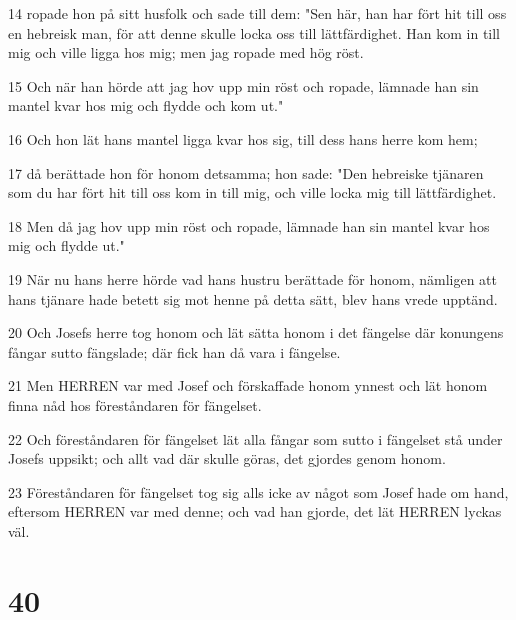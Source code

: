 \par 14 ropade hon på sitt husfolk och sade till dem: "Sen här, han har fört hit till oss en hebreisk man, för att denne skulle locka oss till lättfärdighet. Han kom in till mig och ville ligga hos mig; men jag ropade med hög röst.
\par 15 Och när han hörde att jag hov upp min röst och ropade, lämnade han sin mantel kvar hos mig och flydde och kom ut."
\par 16 Och hon lät hans mantel ligga kvar hos sig, till dess hans herre kom hem;
\par 17 då berättade hon för honom detsamma; hon sade: "Den hebreiske tjänaren som du har fört hit till oss kom in till mig, och ville locka mig till lättfärdighet.
\par 18 Men då jag hov upp min röst och ropade, lämnade han sin mantel kvar hos mig och flydde ut."
\par 19 När nu hans herre hörde vad hans hustru berättade för honom, nämligen att hans tjänare hade betett sig mot henne på detta sätt, blev hans vrede upptänd.
\par 20 Och Josefs herre tog honom och lät sätta honom i det fängelse där konungens fångar sutto fängslade; där fick han då vara i fängelse.
\par 21 Men HERREN var med Josef och förskaffade honom ynnest och lät honom finna nåd hos föreståndaren för fängelset.
\par 22 Och föreståndaren för fängelset lät alla fångar som sutto i fängelset stå under Josefs uppsikt; och allt vad där skulle göras, det gjordes genom honom.
\par 23 Föreståndaren för fängelset tog sig alls icke av något som Josef hade om hand, eftersom HERREN var med denne; och vad han gjorde, det lät HERREN lyckas väl.

\chapter{40}

